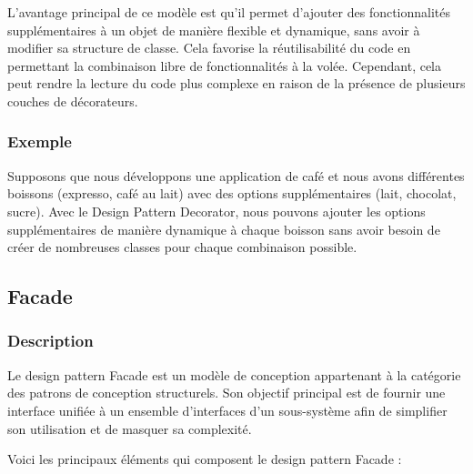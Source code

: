 \documentclass[french]{article}
\begin{document}
L'avantage principal de ce modèle est qu'il permet d'ajouter des fonctionnalités supplémentaires à un objet de manière flexible et dynamique, sans avoir à modifier sa structure de classe. Cela favorise la réutilisabilité du code en permettant la combinaison libre de fonctionnalités à la volée. Cependant, cela peut rendre la lecture du code plus complexe en raison de la présence de plusieurs couches de décorateurs.


\subsubsection{Exemple}

Supposons que nous développons une application de café et nous avons différentes boissons (expresso, café au lait) avec des options supplémentaires (lait, chocolat, sucre). Avec le Design Pattern Decorator, nous pouvons ajouter les options supplémentaires de manière dynamique à chaque boisson sans avoir besoin de créer de nombreuses classes pour chaque combinaison possible.




\newpage

\subsection{Facade}

\subsubsection{Description}

Le design pattern Facade est un modèle de conception appartenant à la catégorie des patrons de conception structurels. Son objectif principal est de fournir une interface unifiée à un ensemble d'interfaces d'un sous-système afin de simplifier son utilisation et de masquer sa complexité.

Voici les principaux éléments qui composent le design pattern Facade :
\end{document}
